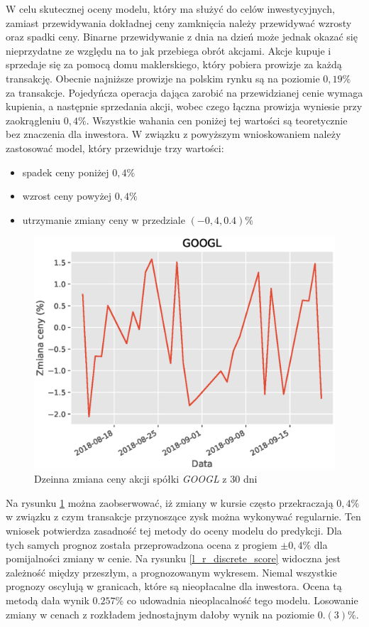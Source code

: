 \documentclass[a4paper, twoside, 11pt, openright]{article}
\begin{document}
W celu skutecznej oceny modelu, który ma służyć do celów inwestycyjnych, zamiast przewidywania dokładnej ceny zamknięcia należy przewidywać wzrosty oraz spadki ceny. Binarne przewidywanie z dnia na dzień może jednak okazać się nieprzydatne ze względu na to jak przebiega obrót akcjami. Akcje kupuje i sprzedaje się za pomocą domu maklerskiego, który pobiera prowizje za każdą transakcję. Obecnie najniższe prowizje na polskim rynku są na poziomie $0,19\%$ za transakcje. Pojedyńcza operacja dająca zarobić na przewidzianej cenie wymaga kupienia, a następnie sprzedania akcji, wobec czego łączna prowizja wyniesie przy zaokrągleniu $0,4\%$. Wszystkie wahania cen poniżej tej wartości są teoretycznie bez znaczenia dla inwestora. W związku z powyższym wnioskowaniem należy zastosować model, który przewiduje trzy wartości:
\begin{itemize}
\item spadek ceny poniżej $0,4\%$
\item wzrost ceny powyżej $0,4\%$
\item utrzymanie zmiany ceny w przedziale $(-0,4, 0.4)\%$
\end{itemize}


\begin{figure}[H]
\centering \includegraphics[scale=0.9]{img/linear_regression/l_r_pct_change_last_30}
\caption{Dzeinna zmiana ceny akcji spółki \textit{GOOGL} z 30 dni}
\label{l_r_pct_change_last_30}
\end{figure}


Na rysunku \ref{l_r_pct_change_last_30} można zaobserwować, iż zmiany w kursie często przekraczają $0,4\%$ w związku z czym transakcje przynoszące zysk można wykonywać regularnie. Ten wniosek potwierdza zasadność tej metody do oceny modelu do predykcji. Dla tych samych prognoz została przeprowadzona ocena z progiem $\pm0,4\%$ dla pomijalności zmiany w cenie. Na rysunku \ref{l_r_discrete_score} widoczna jest zależność między przeszłym, a prognozowanym wykresem. Niemal wszystkie prognozy oscylują w granicach, które są nieopłacalne dla inwestora. Ocena tą metodą dała wynik $0.257\%$ co udowadnia nieoplacalność tego modelu. Losowanie zmiany w cenach z rozkładem jednostajnym dałoby wynik na poziomie $0.(3)\%$.
\end{document}
